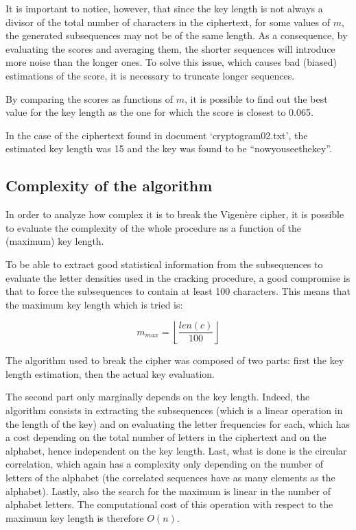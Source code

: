\documentclass[12pt]{article}
\begin{document}
It is important to notice, however, that since the key length is not always a divisor of the total number of characters in the ciphertext, for some values of $m$, the generated subsequences may not be of the same length. As a consequence, by evaluating the scores and averaging them, the shorter sequences will introduce more noise than the longer ones. To solve this issue, which causes bad (biased) estimations of the score, it is necessary to truncate longer sequences.

By comparing the scores as functions of $m$, it is possible to find out the best value for the key length as the one for which the score is closest to 0.065.

In the case of the ciphertext found in document `cryptogram02.txt', the estimated key length was 15 and the key was found to be ``nowyouseethekey''.

\subsection{Complexity of the algorithm}

In order to analyze how complex it is to break the Vigenère cipher, it is possible to evaluate the complexity of the whole procedure as a function of the (maximum) key length.

To be able to extract good statistical information from the subsequences to evaluate the letter densities used in the cracking procedure, a good compromise is that to force the subsequences to contain at least 100 characters. This means that the maximum key length which is tried is:

\begin{equation}
  \label{eq:2}
  m_{max} = \left\lfloor \frac{len(c)}{100} \right\rfloor
\end{equation}

The algorithm used to break the cipher was composed of two parts: first the key length estimation, then the actual key evaluation.

The second part only marginally depends on the key length. Indeed, the algorithm consists in extracting the subsequences (which is a linear operation in the length of the key) and on evaluating the letter frequencies for each, which has a cost depending on the total number of letters in the ciphertext and on the alphabet, hence independent on the key length.
Last, what is done is the circular correlation, which again has a complexity only depending on the number of letters of the alphabet (the correlated sequences have as many elements as the alphabet). Lastly, also the search for the maximum is linear in the number of alphabet letters.
The computational cost of this operation with respect to the maximum key length is therefore $O(n)$.
\end{document}
